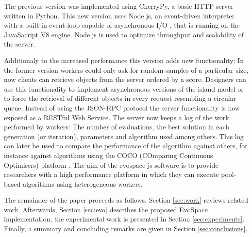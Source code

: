 The previous version %
was implemented using CherryPy, a basic HTTP 
server written in Python. This new version uses Node.js, an 
event-driven interpreter with a built-in event loop capable of
asynchronous I/O \cite{tilkov2010node}, that is 
running on the JavaSacript V8 engine. Node.js is used 
to optimize throughput and scalability of the server. %

Additionaly to the  increased performance this version 
adds new functionality: In the former version workers could only
ask for random samples of a particular size, now clients 
can retrieve objects from the server ordered by a score. 
Designers can use this functionality to implement 
asynchronous versions of the island model or to force 
the retrieval of different objects in every request 
resembling a circular queue. Instead of using the JSON-RPC 
protocol the server functionality is now exposed as a RESTful 
Web Service. The server now keeps a log of the work performed 
by workers: The number of evaluations, the best solution in each 
generation (or iteration), parameters and algorithm used among others.
This log can later be used to compare the performance of 
the algorithm against others, for instance against 
algorithms using the COCO (COmparing Continuous Optimisers)
platform \cite{hansen2016coco}.
The aim of the {\sf evospace-js} software is to provide 
researchers with a high performance platform in which 
they can execute pool-based algorithms using heterogeneous workers. 

The remainder of the paper proceeds as follows. Section \ref{sec:work} 
reviews related work. Afterwards, Section \ref{sec:evo} describes the
proposed EvoSpace implementation, the experimental work is presented in 
Section \ref{sec:experiments}. Finally, a summary and 
concluding remarks are given in Section \ref{sec:conclusions}.


